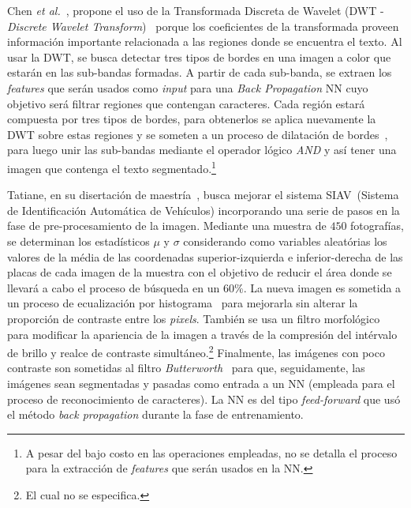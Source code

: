 Chen \textit{et al.}~\cite{Chen:2009:LPTLusingDWT}, propone el uso de la
Transformada Discreta de Wavelet (DWT - \textit{Discrete Wavelet
Transform})~\cite{Heil:1989:C&DWT, Burrus:1998:ItoW} porque los coeficientes de
la transformada proveen información importante relacionada a las regiones donde
se encuentra el texto. Al usar la DWT, se busca detectar tres tipos de bordes en
una imagen a color que estarán en las sub-bandas formadas. A partir de cada
sub-banda, se extraen los \textit{features} que serán usados como \textit{input}
para una \textit{Back Propagation} NN cuyo objetivo será filtrar regiones que
contengan caracteres. Cada región estará compuesta por tres tipos de bordes,
para obtenerlos se aplica nuevamente la DWT sobre estas regiones y se someten a
un proceso de dilatación de bordes~\cite{Dil:web}, para luego unir las
sub-bandas mediante el operador lógico \textit{AND} y así tener una imagen que
contenga el texto segmentado.\footnote{A pesar del bajo costo en las operaciones
empleadas, no se detalla el proceso para la extracción de \textit{features} que
serán usados en la NN.}

Tatiane, en su disertación de maestría~\cite{Tatiane:2001:RCAP}, busca mejorar
el sistema SIAV~(Sistema de Identificación Automática de Vehículos) incorporando
una serie de pasos en la fase de pre-procesamiento de la imagen. Mediante una
muestra de $450$ fotografías, se determinan los estadísticos $\mu$ y $\sigma$
considerando como variables aleatórias los valores de la média de las
coordenadas superior-izquierda e inferior-derecha de las placas de cada imagen
de la muestra con el objetivo de reducir el área donde se llevará a cabo el
proceso de búsqueda en un $60\%$. La nueva imagen es sometida a un proceso de
ecualización por histograma~\cite{Marques:1999:Equalizacao} para mejorarla sin
alterar la proporción de contraste entre los \textit{pixels}. También se usa un
filtro morfológico para modificar la apariencia de la imagen a través de la
compresión del intérvalo de brillo y realce de contraste simultáneo.\footnote{El
cual no se especifica.} Finalmente, las imágenes con poco contraste son
sometidas al filtro \textit{Butterworth}~\cite[pág. 306]{Gonzalez:2002:DIP} para
que, seguidamente, las imágenes sean segmentadas y pasadas como entrada a un NN
(empleada para el proceso de reconocimiento de caracteres). La NN es del tipo
\textit{feed-forward} que usó el método \textit{back propagation} durante la
fase de entrenamiento.

